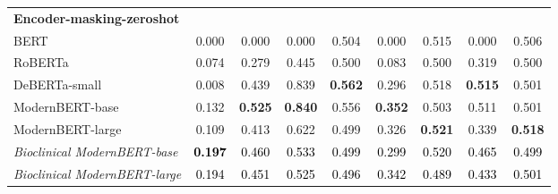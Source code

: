 \begin{table}[htbp]
\begin{ChSevenFloatBody}
{\begin{tabular}{lcccccccc}
\midrule
\textbf{Encoder-masking-zeroshot} &&&&&&&&\\
BERT & 0.000 & 0.000 & 0.000 & 0.504 & 0.000 & 0.515 & 0.000 & 0.506 \\
RoBERTa & 0.074 & 0.279 & 0.445 & 0.500 & 0.083 & 0.500 & 0.319 & 0.500 \\
DeBERTa-small & 0.008 & 0.439 & 0.839 & \textbf{0.562} & 0.296 & 0.518 & \textbf{0.515} & 0.501 \\
ModernBERT-base & 0.132 & \textbf{0.525} & \textbf{0.840} & 0.556 & \textbf{0.352} & 0.503 & 0.511 & 0.501 \\
ModernBERT-large & 0.109 & 0.413 & 0.622 & 0.499 & 0.326 & \textbf{0.521} & 0.339 & \textbf{0.518} \\
\textit{Bioclinical ModernBERT-base} & \textcolor{black}{\textbf{0.197}} & \textcolor{black}{0.460} & \textcolor{black}{0.533} & \textcolor{black}{0.499} & \textcolor{black}{0.299} & \textcolor{black}{0.520} & \textcolor{black}{0.465} & \textcolor{black}{0.499} \\
\textit{Bioclinical ModernBERT-large} & \textcolor{black}{0.194} & \textcolor{black}{0.451} & \textcolor{black}{0.525} & \textcolor{black}{0.496} & \textcolor{black}{0.342} & \textcolor{black}{0.489} & \textcolor{black}{0.433} & \textcolor{black}{0.501} \\
\bottomrule
\end{tabular}
}



\end{ChSevenFloatBody}
\end{table}